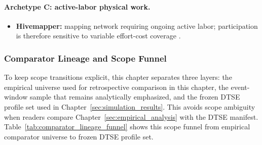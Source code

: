 \paragraph{Archetype C: active-labor physical work.}
\begin{itemize}
    \item \textbf{Hivemapper:} mapping network requiring ongoing active labor; participation is therefore sensitive to variable effort-cost coverage \cite{Chiu2024, FrontiersDePIN2025}.
\end{itemize}

\subsubsection{Comparator Lineage and Scope Funnel}
To keep scope transitions explicit, this chapter separates three layers: the empirical universe used for retrospective comparison in this chapter, the event-window sample that remains analytically emphasized, and the frozen DTSE profile set used in Chapter~\ref{sec:simulation_results}. This avoids scope ambiguity when readers compare Chapter~\ref{sec:empirical_analysis} with the DTSE manifest.
Table~\ref{tab:comparator_lineage_funnel} shows this scope funnel from empirical comparator universe to frozen DTSE profile set.

